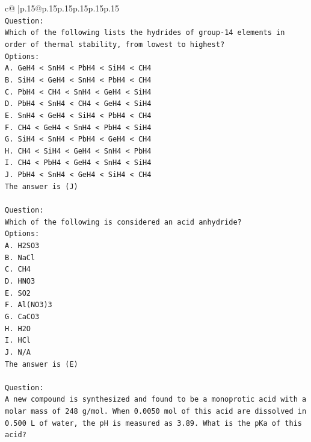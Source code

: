 \documentclass{article}
\begin{document}
{\begin{supertabular}{c@{$\;$}|p{.15\linewidth}@{}p{.15\linewidth}p{.15\linewidth}p{.15\linewidth}p{.15\linewidth}p{.15\linewidth}}
{{{\\ 
\texttt{Question:} \\
\texttt{Which of the following lists the hydrides of group{-}14 elements in order of thermal stability, from lowest to highest?} \\
\texttt{Options:} \\
\texttt{A. GeH4 < SnH4 < PbH4 < SiH4 < CH4} \\
\texttt{B. SiH4 < GeH4 < SnH4 < PbH4 < CH4} \\
\texttt{C. PbH4 < CH4 < SnH4 < GeH4 < SiH4} \\
\texttt{D. PbH4 < SnH4 < CH4 < GeH4 < SiH4} \\
\texttt{E. SnH4 < GeH4 < SiH4 < PbH4 < CH4} \\
\texttt{F. CH4 < GeH4 < SnH4 < PbH4 < SiH4} \\
\texttt{G. SiH4 < SnH4 < PbH4 < GeH4 < CH4} \\
\texttt{H. CH4 < SiH4 < GeH4 < SnH4 < PbH4} \\
\texttt{I. CH4 < PbH4 < GeH4 < SnH4 < SiH4} \\
\texttt{J. PbH4 < SnH4 < GeH4 < SiH4 < CH4} \\
\texttt{The answer is (J)} \\
\\ 
\texttt{Question:} \\
\texttt{Which of the following is considered an acid anhydride?} \\
\texttt{Options:} \\
\texttt{A. H2SO3} \\
\texttt{B. NaCl} \\
\texttt{C. CH4} \\
\texttt{D. HNO3} \\
\texttt{E. SO2} \\
\texttt{F. Al(NO3)3} \\
\texttt{G. CaCO3} \\
\texttt{H. H2O} \\
\texttt{I. HCl} \\
\texttt{J. N/A} \\
\texttt{The answer is (E)} \\
\\ 
\texttt{Question:} \\
\texttt{A new compound is synthesized and found to be a monoprotic acid with a molar mass of 248 g/mol. When 0.0050 mol of this acid are dissolved in 0.500 L of water, the pH is measured as 3.89. What is the pKa of this acid?} \\
}}}
\end{supertabular}}
\end{document}
